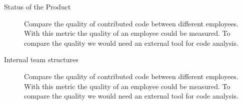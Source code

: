 \begin{description}
    \item[Status of the Product] \hfill
        Compare the quality of contributed code between different employees.
        With this metric the quality of an employee could be measured.
        To compare the quality we would need an external tool for code analysis.

    \item[Internal team structures] \hfill
        Compare the quality of contributed code between different employees.
        With this metric the quality of an employee could be measured.
        To compare the quality we would need an external tool for code analysis.
    \end{description}
